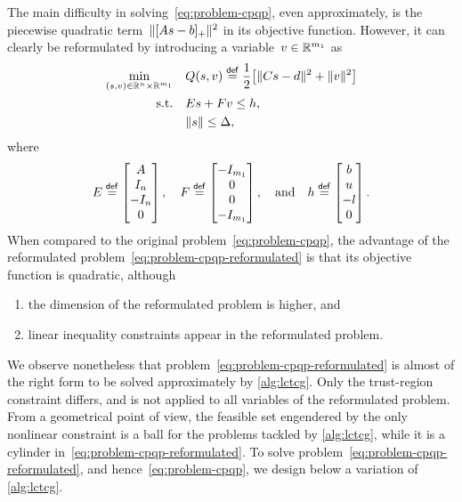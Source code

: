 The main difficulty in solving~\cref{eq:problem-cpqp}, even approximately, is the piecewise quadratic term~$\norm{\posp{A \sstep - b}}^2$ in its objective function.
However, it can clearly be reformulated by introducing a variable~$v \in \mathbb{R}^{m_1}$ as
\begin{subequations}
    \label{eq:problem-cpqp-reformulated}
    \begin{align}
        \min_{(\sstep, v) \in \R^n \times \R^{m_1}} & \quad Q(\sstep, v) \eqdef \frac{1}{2} \big[ \norm{C \sstep - d}^2 + \norm{v}^2 \big]\\
        \text{s.t.}                                 & \quad E \sstep + F v \le h,\\
                                                    & \quad \norm{\sstep} \le \rad,
    \end{align}
\end{subequations}
where
\begin{equation*}
    E \mathrel{\stackrel{\mathsf{def}}{=}}
    \begin{bmatrix}
        A\\
        I_n\\
        -I_n\\
        0
    \end{bmatrix}, \quad
    F \mathrel{\stackrel{\mathsf{def}}{=}}
    \begin{bmatrix}
        -I_{m_1}\\
        0\\
        0\\
        -I_{m_1}
    \end{bmatrix}, \quad \text{and} \quad
    h \mathrel{\stackrel{\mathsf{def}}{=}}
    \begin{bmatrix}
        b\\
        u\\
        -l\\
        0
    \end{bmatrix}.
\end{equation*}
When compared to the original problem~\cref{eq:problem-cpqp}, the advantage of the reformulated problem~\cref{eq:problem-cpqp-reformulated} is that its objective function is quadratic, although
\begin{enumerate}
    \item the dimension of the reformulated problem is higher, and
    \item linear inequality constraints appear in the reformulated problem.
\end{enumerate}

We observe nonetheless that problem~\cref{eq:problem-cpqp-reformulated} is almost of the right form to be solved approximately by \cref{alg:lctcg}.
Only the trust-region constraint differs, and is not applied to all variables of the reformulated problem.
From a geometrical point of view, the feasible set engendered by the only nonlinear constraint is a ball for the problems tackled by \cref{alg:lctcg}, while it is a cylinder in~\cref{eq:problem-cpqp-reformulated}.
To solve problem~\cref{eq:problem-cpqp-reformulated}, and hence~\cref{eq:problem-cpqp}, we design below a variation of \cref{alg:lctcg}.

